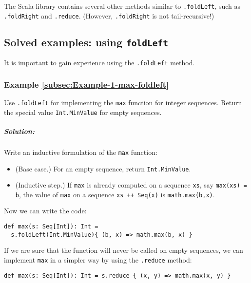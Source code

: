 The Scala library contains several other methods similar to \lstinline!.foldLeft!,
such as \lstinline!.foldRight!
and \lstinline!.reduce!.
(However, \lstinline!.foldRight!
is not tail-recursive!)

\subsection{Solved examples: using \texttt{foldLeft}}

It is important to gain experience using the \lstinline!.foldLeft!
method.

\subsubsection{Example \label{subsec:Example-1-max-foldleft}\ref{subsec:Example-1-max-foldleft}}

Use \lstinline!.foldLeft!
for implementing the \lstinline!max!
function for integer sequences. Return the special value \lstinline!Int.MinValue!
for empty sequences.

\subparagraph{Solution:}

Write an inductive formulation of the \lstinline!max!
function:
\begin{itemize}
\item (Base case.) For an empty sequence, return \lstinline!Int.MinValue!.
\item (Inductive step.) If \lstinline!max!
is already computed on a sequence \lstinline!xs!,
say \lstinline!max(xs) = b!,
the value of \lstinline!max!
on a sequence \lstinline!xs ++ Seq(x)!
is \lstinline!math.max(b,x)!. 
\end{itemize}
Now we can write the code:

\begin{lstlisting}
def max(s: Seq[Int]): Int = 
  s.foldLeft(Int.MinValue){ (b, x) => math.max(b, x) }
\end{lstlisting}
If we are sure that the function will never be called on empty sequences,
we can implement \lstinline!max!
in a simpler way by using the \lstinline!.reduce!
method:
\begin{lstlisting}
def max(s: Seq[Int]): Int = s.reduce { (x, y) => math.max(x, y) }
\end{lstlisting}

